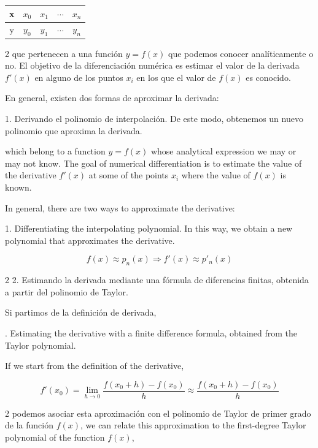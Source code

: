 \begin{table}[h]
\centering
\begin{tabular}{c|cccc}
x&$x_0$&$x_1$&$\cdots$&$x_n$\\
\hline
y&$y_0$&$y_1$&$\cdots$&$y_n$
\end{tabular}
\end{table}
\begin{paracol}{2}
que pertenecen a una función $y=f(x)$ que podemos conocer analíticamente o no. El objetivo de la diferenciación numérica es estimar el valor de la derivada $f'(x)$ en alguno de los puntos $x_i$ en los que el valor de $f(x)$ es conocido.

En general, existen dos formas de aproximar la derivada:

1. Derivando el polinomio de interpolación. De este modo, obtenemos un nuevo polinomio que aproxima la derivada.

\switchcolumn
which belong to a function $y = f(x)$ whose analytical expression we may or may not know. The goal of numerical differentiation is to estimate the value of the derivative $f'(x)$ at some of the points $x_i$ where the value of $f(x)$ is known.

In general, there are two ways to approximate the derivative:

1. Differentiating the interpolating polynomial. In this way, we obtain a new polynomial that approximates the derivative.
\end{paracol}
\begin{equation*}
f(x)\approx p_n(x) \Rightarrow f'(x) \approx p'_n(x)
\end{equation*}
\begin{paracol}{2}
2. Estimando la derivada mediante una fórmula de diferencias finitas, obtenida a partir del polinomio de Taylor.

Si partimos de la definición de derivada,

. Estimating the derivative with a finite difference formula, obtained from the Taylor polynomial.

If we start from the definition of the derivative,
\end{paracol}
\begin{equation*}
f'(x_0)=\lim_{h\rightarrow 0}\frac{f(x_0+h)-f(x_0)}{h} \approx \frac{f(x_0+h)-f(x_0)}{h}
\end{equation*}
\begin{paracol}{2}
podemos asociar esta aproximación con el polinomio de Taylor de primer grado de la función $f(x)$,
\switchcolumn
we can relate this approximation to the first-degree Taylor polynomial of the function $f(x)$,
\end{paracol}
